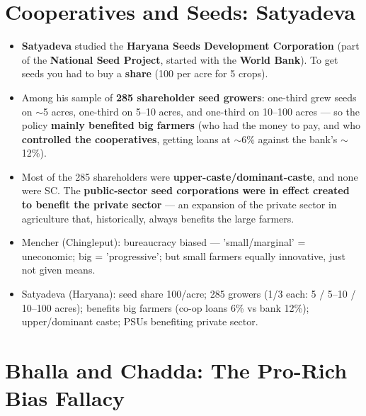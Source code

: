 \section{Cooperatives and Seeds: Satyadeva}

\begin{KeyConcept}
\begin{itemize}
\item \textbf{Satyadeva} studied the \textbf{Haryana Seeds Development Corporation} (part of the \textbf{National Seed Project}, started with the \textbf{World Bank}). To get seeds you had to buy a \textbf{share} (\rupee{}100 per acre for 5 crops).
\item Among his sample of \textbf{285 shareholder seed growers}: one-third grew seeds on $\sim$5 acres, one-third on 5--10 acres, and one-third on 10--100 acres --- so the policy \textbf{mainly benefited big farmers} (who had the money to pay, and who \textbf{controlled the cooperatives}, getting loans at $\sim$6\% against the bank's $\sim$12\%).
\item Most of the 285 shareholders were \textbf{upper-caste/dominant-caste}, and none were SC. The \textbf{public-sector seed corporations were in effect created to benefit the private sector} --- an expansion of the private sector in agriculture that, historically, always benefits the large farmers.
\end{itemize}
\end{KeyConcept}

\begin{QuickRevision}
\begin{itemize}
\item Mencher (Chingleput): bureaucracy biased --- 'small/marginal' = uneconomic; big = 'progressive'; but small farmers equally innovative, just not given means.
\item Satyadeva (Haryana): seed share \rupee{}100/acre; 285 growers (1/3 each: 5 / 5--10 / 10--100 acres); benefits big farmers (co-op loans 6\% vs bank 12\%); upper/dominant caste; PSUs benefiting private sector.
\end{itemize}
\end{QuickRevision}

\section{Bhalla and Chadda: The Pro-Rich Bias Fallacy}


